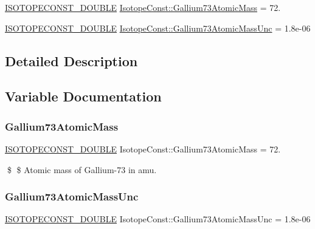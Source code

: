 \begin{DoxyCompactItemize}
\item 
\mbox{\hyperlink{group___isotope_const-_macros_ga8f45a7272ce02c0b4c65c44636ed719a}{I\+S\+O\+T\+O\+P\+E\+C\+O\+N\+S\+T\+\_\+\+D\+O\+U\+B\+LE}} \mbox{\hyperlink{group___isotope_const-_gallium-_ga73_gac48b0724dd1e21a14d199a8ee8e4ed21}{Isotope\+Const\+::\+Gallium73\+Atomic\+Mass}} = 72.
\item 
\mbox{\hyperlink{group___isotope_const-_macros_ga8f45a7272ce02c0b4c65c44636ed719a}{I\+S\+O\+T\+O\+P\+E\+C\+O\+N\+S\+T\+\_\+\+D\+O\+U\+B\+LE}} \mbox{\hyperlink{group___isotope_const-_gallium-_ga73_gac2ce52f712498d0a9a433f7cbb31dec5}{Isotope\+Const\+::\+Gallium73\+Atomic\+Mass\+Unc}} = 1.\+8e-\/06
\end{DoxyCompactItemize}


\subsection{Detailed Description}


\subsection{Variable Documentation}
\mbox{\label{group___isotope_const-_gallium-_ga73_gac48b0724dd1e21a14d199a8ee8e4ed21}} 
\subsubsection{\texorpdfstring{Gallium73\+Atomic\+Mass}{Gallium73AtomicMass}}
{\footnotesize\ttfamily \mbox{\hyperlink{group___isotope_const-_macros_ga8f45a7272ce02c0b4c65c44636ed719a}{I\+S\+O\+T\+O\+P\+E\+C\+O\+N\+S\+T\+\_\+\+D\+O\+U\+B\+LE}} Isotope\+Const\+::\+Gallium73\+Atomic\+Mass = 72.}

\$ \$ Atomic mass of Gallium-\/73 in amu. \mbox{\label{group___isotope_const-_gallium-_ga73_gac2ce52f712498d0a9a433f7cbb31dec5}} 
\subsubsection{\texorpdfstring{Gallium73\+Atomic\+Mass\+Unc}{Gallium73AtomicMassUnc}}
{\footnotesize\ttfamily \mbox{\hyperlink{group___isotope_const-_macros_ga8f45a7272ce02c0b4c65c44636ed719a}{I\+S\+O\+T\+O\+P\+E\+C\+O\+N\+S\+T\+\_\+\+D\+O\+U\+B\+LE}} Isotope\+Const\+::\+Gallium73\+Atomic\+Mass\+Unc = 1.\+8e-\/06}

